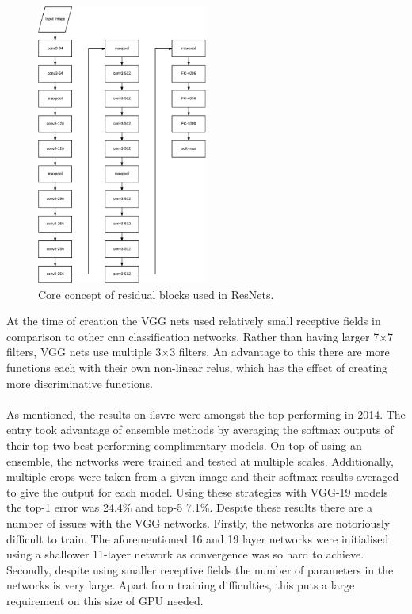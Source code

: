 \begin{figure}[H]
  \centering
    \includegraphics[width=0.5\textwidth]{Figs/Techanal/vggarch.pdf}
    \caption{Core concept of residual blocks used in ResNets.}
    \label{fig:vggarch}
\end{figure}

At the time of creation the VGG nets used relatively small receptive fields in comparison to other \gls{cnn} classification networks. Rather than having larger 7$\times$7 filters, VGG nets use multiple 3$\times$3 filters. An advantage to this there are more functions each with their own non-linear \glspl{relu}, which has the effect of creating more discriminative functions.
\\\\
As mentioned, the results on \gls{ilsvrc} were amongst the top performing in 2014. The entry took advantage of ensemble methods by averaging the softmax outputs of their top two best performing complimentary models. On top of using an ensemble, the networks were trained and tested at multiple scales. Additionally, multiple crops were taken from a given image and their softmax results averaged to give the output for each model. Using these strategies with VGG-19 models the top-1 error was 24.4\% and top-5 7.1\%. Despite these results there are a number of issues with the VGG networks. Firstly, the networks are notoriously difficult to train. The aforementioned 16 and 19 layer networks were initialised using a shallower 11-layer network as convergence was so hard to achieve. Secondly, despite using smaller receptive fields the number of parameters in the networks is very large. Apart from training difficulties, this puts a large requirement on this size of GPU needed. 

